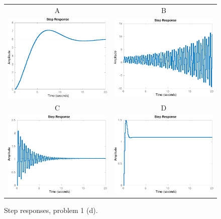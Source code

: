 \documentclass[letterpaper,12pt]{article}
\begin{document}
\begin{figure}[tp]
\begin{center}
\begin{tabular}{cc}
A & B\\
\includegraphics[width=0.4\linewidth]{step-plot-1-vt17-crop}
&\includegraphics[width=0.4\linewidth]{step-plot-4-vt17-crop}\\
C & D\\
\includegraphics[width=0.4\linewidth]{step-plot-3-vt17-crop}
&\includegraphics[width=0.4\linewidth]{step-plot-2-vt17-crop}

\end{tabular}
\caption{Step responses, problem 1 (d).}
\label{fig:step}
\end{center}
\end{figure}
\end{document}
